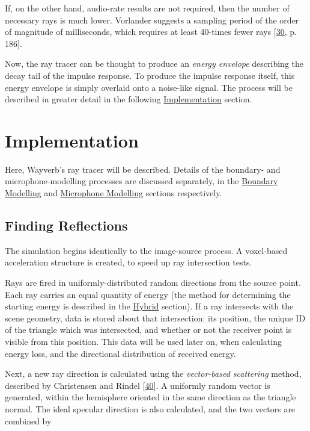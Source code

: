 \documentclass[]{scrreprt}
\begin{document}
If, on the other hand, audio-rate results are not required, then the
number of necessary rays is much lower. Vorlander suggests a sampling
period of the order of magnitude of milliseconds, which requires at
least 40-times fewer rays
{[}\protect\hyperlink{ref-vorlanderux5fauralization:ux5f2007}{30}, p.
186{]}.

Now, the ray tracer can be thought to produce an \emph{energy envelope}
describing the decay tail of the impulse response. To produce the
impulse response itself, this energy envelope is simply overlaid onto a
noise-like signal. The process will be described in greater detail in
the following \protect\hyperlink{implementation-3}{Implementation}
section.

\section{Implementation}\label{implementation-1}

Here, Wayverb's ray tracer will be described. Details of the boundary-
and microphone-modelling processes are discussed separately, in the
\href{\%7B\%7B\%20site.baseurl\%20\%7D\%7D\%7B\%\%20link\%20boundary.md\%20\%\%7D}{Boundary
Modelling} and
\href{\%7B\%7B\%20site.baseurl\%20\%7D\%7D\%7B\%\%20link\%20microphone.md\%20\%\%7D}{Microphone
Modelling} sections respectively.

\subsection{Finding Reflections}\label{finding-reflections}

The simulation begins identically to the image-source process. A
voxel-based acceleration structure is created, to speed up ray
intersection tests.

Rays are fired in uniformly-distributed random directions from the
source point. Each ray carries an equal quantity of energy (the method
for determining the starting energy is described in the
\href{\%7B\%7B\%20site.baseurl\%20\%7D\%7D\%7B\%\%20link\%20hybrid.md\%20\%\%7D}{Hybrid}
section). If a ray intersects with the scene geometry, data is stored
about that intersection: its position, the unique ID of the triangle
which was intersected, and whether or not the receiver point is visible
from this position. This data will be used later on, when calculating
energy loss, and the directional distribution of received energy.

Next, a new ray direction is calculated using the \emph{vector-based
scattering} method, described by Christensen and Rindel
{[}\protect\hyperlink{ref-christensenux5fnewux5f2005}{40}{]}. A
uniformly random vector is generated, within the hemisphere oriented in
the same direction as the triangle normal. The ideal specular direction
is also calculated, and the two vectors are combined by
\end{document}
